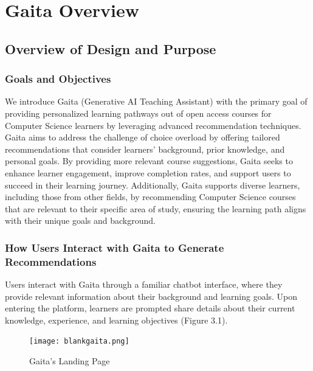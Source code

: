 \chapter{Gaita Overview} \label{chap:chap-3}





\section{Overview of Design and Purpose}

\subsection{Goals and Objectives}
We introduce Gaita (Generative AI Teaching Assistant) with the primary goal of providing personalized learning pathways out of open access courses for Computer Science learners by leveraging advanced recommendation techniques. Gaita aims to address the challenge of choice overload by offering tailored recommendations that consider learners' background, prior knowledge, and personal goals. By providing more relevant course suggestions, Gaita seeks to enhance learner engagement, improve completion rates, and support users to succeed in their learning journey. Additionally, Gaita supports diverse learners, including those from other fields, by recommending Computer Science courses that are relevant to their specific area of study, ensuring the learning path aligns with their unique goals and background.

\subsection{How Users Interact with Gaita to Generate Recommendations}

Users interact with Gaita through a familiar chatbot interface, where they provide relevant information about their background and learning goals. Upon entering the platform, learners are prompted share details about their current knowledge, experience, and learning objectives (Figure 3.1). 


\begin{figure}[ht]
\begin{center}
    \texttt{[image: blankgaita.png]}
    \caption{Gaita's Landing Page}
    \label{fig:blankgaita}
\end{center}
\end{figure}


